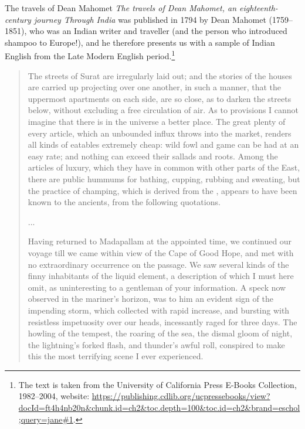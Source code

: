 \begin{texts}{The travels of Dean Mahomet}
\textit{The travels of Dean Mahomet, an eighteenth-century journey Through India} was published in 1794 by Dean Mahomet (1759--1851), who was an Indian writer and traveller (and the person who introduced shampoo to Europe!), and he therefore presents us with a sample of Indian English from the Late Modern English period.\footnote{The text is taken from the University of California Press E-Books Collection, 1982--2004, website: \url{https://publishing.cdlib.org/ucpressebooks/view?docId=ft4h4nb20n&chunk.id=ch2&toc.depth=100&toc.id=ch2&brand=eschol;query=jane\#1}.}

\begin{quote}
    \internallinenumbers*{}
    The streets of Surat are irregularly laid out; and the stories of the houses are carried up projecting over one another, in such a manner, that the uppermost apartments on each side, are so close, as to darken the streets below, without excluding a free circulation of air. As to provisions I cannot imagine that there is in the universe a better place. The great plenty of every article, which an unbounded influx throws into the market, renders all kinds of eatables extremely cheap: wild fowl and game can be had at an easy rate; and nothing can exceed their sallads and roots. Among the articles of luxury, which they have in common with other parts of the East, there are public hummums for bathing, cupping, rubbing and sweating, but the practice of champing, which is derived from the , appears to have been known to the ancients, from the following quotations.
    
    ...
    
    Having returned to Madapallam at the appointed time, we continued our voyage till we came within view of the Cape of Good Hope, and met with no extraordinary occurrence on the passage. We saw several kinds of the finny inhabitants of the liquid element, a description of which I must here omit, as uninteresting to a gentleman of your information. A speck now observed in the mariner's horizon, was to him an evident sign of the impending storm, which collected with rapid increase, and bursting with resistless impetuosity over our heads, incessantly raged for three days. The howling of the tempest, the roaring of the sea, the dismal gloom of night, the lightning's forked flash, and thunder's awful roll, conspired to make this the most terrifying scene I ever experienced.
    

\end{quote}
\end{texts}
